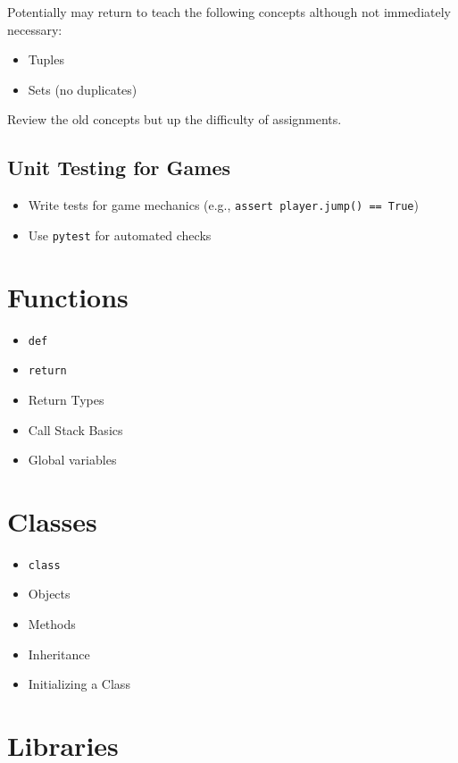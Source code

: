 \documentclass{article}
\begin{document}
Potentially may return to teach the following concepts although not immediately necessary:

\begin{itemize}
    \item Tuples
    \item Sets (no duplicates)
\end{itemize}


Review the old concepts but up the difficulty of assignments. 

\subsection{Unit Testing for Games}
\begin{itemize}
    \item Write tests for game mechanics (e.g., \verb|assert player.jump() == True|)
    \item Use \verb|pytest| for automated checks
\end{itemize}

\section{Functions}

\begin{itemize}
    \item \verb|def|
    \item \verb|return|
    \item Return Types
    \item Call Stack Basics
    \item Global variables
\end{itemize}

\section{Classes}

\begin{itemize}
    \item \verb|class|
    \item Objects
    \item Methods
    \item Inheritance
    \item Initializing a Class
\end{itemize}

\section{Libraries}
\end{document}
